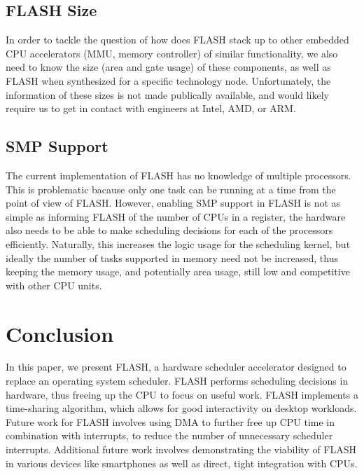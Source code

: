 \documentclass{sig-alternate-10pt}
\begin{document}
\subsection{FLASH Size}
\label{subsec:flash_size}
In order to tackle the question of how does FLASH stack up to other embedded
CPU accelerators (MMU, memory controller) of similar functionality, we also
need to know the size (area and gate usage) of these components, as well as
FLASH when synthesized for a specific technology node. Unfortunately, the
information of these sizes is not made publically available, and would
likely require us to get in contact with engineers at Intel, AMD, or ARM.

\subsection{SMP Support}
The current implementation of FLASH has no knowledge of multiple processors. This is problematic bacause only one task can be running at a time from the point of view of FLASH. However, enabling SMP support in FLASH is not as simple as informing FLASH of the number of CPUs in a register, the hardware also needs to be able to make scheduling decisions for each of the processors efficiently. Naturally, this increases the logic usage for the scheduling kernel, but ideally the number of tasks supported in memory need not be increased, thus keeping the memory usage, and potentially area usage, still low and competitive with other CPU units.

\section{Conclusion}
\label{sec:conclusion}
In this paper, we present FLASH, a hardware scheduler accelerator designed
to replace an operating system scheduler. FLASH performs scheduling
decisions in hardware, thus freeing up the CPU to focus on useful work.
FLASH implements a time-sharing algorithm, which allows for good
interactivity on desktop workloads. Future work for FLASH involves using DMA
to further free up CPU time in combination with interrupts, to reduce the
number of unnecessary scheduler interrupts. Additional future work involves
demonstrating the viability of FLASH in various devices like smartphones as
well as direct, tight integration with CPUs.

\nocite{*}
{
	
	
}
\end{document}
